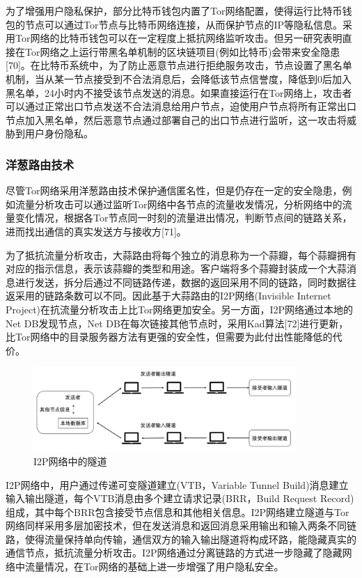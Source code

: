 为了增强用户隐私保护，部分比特币钱包内置了Tor网络配置，使得运行比特币钱包的节点可以通过Tor节点与比特币网络连接，从而保护节点的IP等隐私信息。采用Tor网络的比特币钱包可以在一定程度上抵抗网络监听攻击。但另一研究表明直接在Tor网络之上运行带黑名单机制的区块链项目(例如比特币)会带来安全隐患[70]。在比特币系统中，为了防止恶意节点进行拒绝服务攻击，节点设置了黑名单机制，当从某一节点接受到不合法消息后，会降低该节点信誉度，降低到0后加入黑名单，24小时内不接受该节点发送的消息。如果直接运行在Tor网络上，攻击者可以通过正常出口节点发送不合法消息给用户节点，迫使用户节点将所有正常出口节点加入黑名单，然后恶意节点通过部署自己的出口节点进行监听，这一攻击将威胁到用户身份隐私。

\subsubsection{洋葱路由技术}

尽管Tor网络采用洋葱路由技术保护通信匿名性，但是仍存在一定的安全隐患，例如流量分析攻击可以通过监听Tor网络中各节点的流量收发情况，分析网络中的流量变化情况，根据各Tor节点同一时刻的流量进出情况，判断节点间的链路关系，进而找出通信的真实发送方与接收方[71]。

为了抵抗流量分析攻击，大蒜路由将每个独立的消息称为一个蒜瓣，每个蒜瓣拥有对应的指示信息，表示该蒜瓣的类型和用途。客户端将多个蒜瓣封装成一个大蒜消息进行发送，拆分后通过不同链路传递，数据的返回采用不同的链路，同时数据往返采用的链路条数可以不同。因此基于大蒜路由的I2P网络(Invisible Internet Project)在抗流量分析攻击上比Tor网络更加安全。另一方面，I2P网络通过本地的Net DB发现节点，Net DB在每次链接其他节点时，采用Kad算法[72]进行更新，比Tor网络中的目录服务器方法有更强的安全性，但需要为此付出性能降低的代价。

\begin{figure}
\centering
\includegraphics[width=10cm]{figures/i2p.png}
\caption{I2P网络中的隧道}
\label{fig:i2p}
\end{figure}

I2P网络中，用户通过传递可变隧道建立(VTB，Variable Tunnel Build)消息建立输入输出隧道，每个VTB消息由多个建立请求记录(BRR，Build Request Record)组成，其中每个BRR包含接受节点信息和其他相关信息。I2P网络建立隧道与Tor网络同样采用多层加密技术，但在发送消息和返回消息采用输出和输入两条不同链路，使得流量保持单向传输，通信双方的输入输出隧道将构成环路，能隐藏真实的通信节点，抵抗流量分析攻击。I2P网络通过分离链路的方式进一步隐藏了隐藏网络中流量情况，在Tor网络的基础上进一步增强了用户隐私安全。


